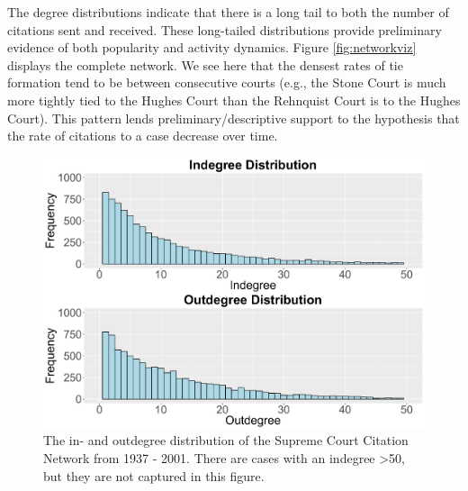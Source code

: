 \documentclass[headsepline=true, abstracton]{scrartcl}
\begin{document}
The degree distributions indicate that there is a long tail to both the number of citations sent and received. These long-tailed distributions provide preliminary evidence of both popularity and activity dynamics. Figure \ref{fig:networkviz} displays the complete network. We see here that the densest rates of tie formation tend to be between consecutive courts (e.g., the Stone Court is much more tightly tied to the Hughes Court than the Rehnquist Court is to the Hughes Court). This pattern lends preliminary/descriptive support to the hypothesis that the rate of citations to a case decrease over time.


\begin{figure}[htp]
\includegraphics[scale=0.5]{degree_distribution}
\caption{The in- and outdegree distribution of the Supreme Court Citation Network from 1937 - 2001. There are cases with an indegree >50, but they are not captured in this figure.}
 \label{degree_dist}
\vspace{-.25cm}
\end{figure}
\end{document}
